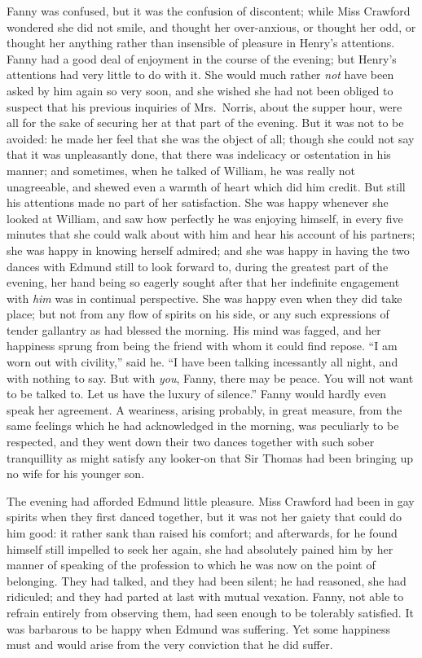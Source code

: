 \documentclass{article}
\begin{document}
Fanny was confused, but it was the confusion of discontent;
while Miss Crawford wondered she did not smile, and thought
her over-anxious, or thought her odd, or thought her anything
rather than insensible of pleasure in Henry's attentions.
Fanny had a good deal of enjoyment in the course of the evening;
but Henry's attentions had very little to do with it.
She would much rather \emph{not} have been asked by him again
so very soon, and she wished she had not been obliged
to suspect that his previous inquiries of Mrs.\ Norris,
about the supper hour, were all for the sake of securing her
at that part of the evening.  But it was not to be avoided:
he made her feel that she was the object of all; though she
could not say that it was unpleasantly done, that there
was indelicacy or ostentation in his manner; and sometimes,
when he talked of William, he was really not unagreeable,
and shewed even a warmth of heart which did him credit.
But still his attentions made no part of her satisfaction.
She was happy whenever she looked at William, and saw how
perfectly he was enjoying himself, in every five minutes
that she could walk about with him and hear his account
of his partners; she was happy in knowing herself admired;
and she was happy in having the two dances with Edmund still
to look forward to, during the greatest part of the evening,
her hand being so eagerly sought after that her indefinite
engagement with \emph{him} was in continual perspective.
She was happy even when they did take place; but not from
any flow of spirits on his side, or any such expressions
of tender gallantry as had blessed the morning.
His mind was fagged, and her happiness sprung from
being the friend with whom it could find repose.
``I am worn out with civility,'' said he.  ``I have been
talking incessantly all night, and with nothing to say.
But with \emph{you}, Fanny, there may be peace.  You will not
want to be talked to.  Let us have the luxury of silence.''
Fanny would hardly even speak her agreement.  A weariness,
arising probably, in great measure, from the same feelings
which he had acknowledged in the morning, was peculiarly
to be respected, and they went down their two dances together
with such sober tranquillity as might satisfy any looker-on
that Sir Thomas had been bringing up no wife for his
younger son.

The evening had afforded Edmund little pleasure.  Miss Crawford
had been in gay spirits when they first danced together,
but it was not her gaiety that could do him good:
it rather sank than raised his comfort; and afterwards,
for he found himself still impelled to seek her again,
she had absolutely pained him by her manner of speaking of the
profession to which he was now on the point of belonging.
They had talked, and they had been silent; he had reasoned,
she had ridiculed; and they had parted at last with
mutual vexation.  Fanny, not able to refrain entirely from
observing them, had seen enough to be tolerably satisfied.
It was barbarous to be happy when Edmund was suffering.
Yet some happiness must and would arise from the very
conviction that he did suffer.
\end{document}
